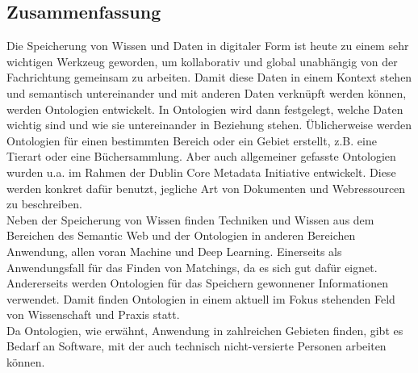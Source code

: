 %
\pagestyle{empty}

\subsection*{Zusammenfassung}

Die Speicherung von Wissen und Daten in digitaler Form ist heute zu einem sehr
wichtigen Werkzeug geworden, um kollaborativ und global unabhängig von der Fachrichtung gemeinsam zu arbeiten. Damit diese Daten in einem Kontext stehen und semantisch untereinander und mit anderen Daten verknüpft werden können, werden Ontologien entwickelt. In Ontologien wird dann festgelegt, welche Daten wichtig sind und wie sie untereinander in Beziehung stehen. Üblicherweise werden Ontologien für einen bestimmten Bereich oder ein Gebiet erstellt, z.B. eine Tierart oder eine Büchersammlung. Aber auch allgemeiner gefasste Ontologien wurden u.a. im Rahmen der Dublin Core Metadata Initiative  entwickelt. Diese werden konkret dafür benutzt, jegliche Art von Dokumenten und Webressourcen zu beschreiben.\\
Neben der Speicherung von Wissen finden Techniken und Wissen aus dem Bereichen
des Semantic Web und der Ontologien in anderen Bereichen Anwendung, allen voran
Machine und Deep Learning. Einerseits als Anwendungsfall für das Finden von
Matchings, da es sich gut dafür eignet. Andererseits werden Ontologien für das Speichern gewonnener Informationen verwendet. Damit finden Ontologien in einem aktuell im Fokus stehenden Feld von Wissenschaft und Praxis statt.\\
Da Ontologien, wie erwähnt, Anwendung in zahlreichen Gebieten finden, gibt es
Bedarf an Software, mit der auch technisch nicht-versierte Personen arbeiten können. 

\cleardoublepage